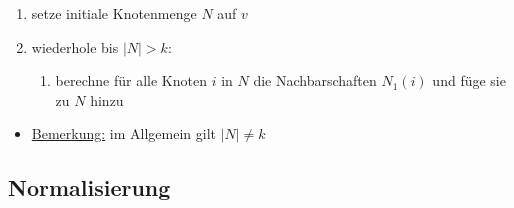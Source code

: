\begin{enumerate}
  \item setze initiale Knotenmenge $N$ auf $v$
  \item wiederhole bis $|N| > k$:
    \begin{enumerate}
      \item berechne für alle Knoten $i$ in $N$ die Nachbarschaften $N_1(i)$ und füge sie zu $N$ hinzu
    \end{enumerate}
\end{enumerate}

\begin{itemize}
  \item \underline{Bemerkung:} im Allgemein gilt $|N| \neq k$
\end{itemize}

\subsection{Normalisierung}

